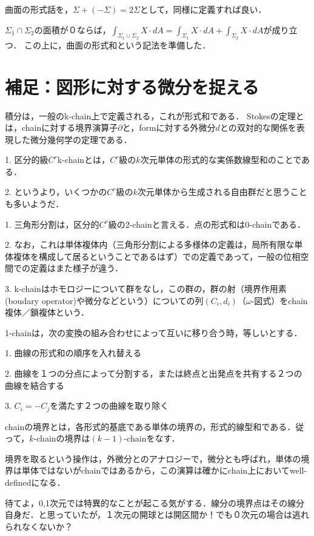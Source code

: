 \documentclass[uplatex, dvipdfmx]{jsreport}
\begin{document}
\begin{definition}[スカラー場の場合]
    曲面の形式話を，$\Sigma+(-\Sigma)=2\Sigma$として，同様に定義すれば良い．
\end{definition}

\begin{screen}
    $\Sigma_1\cap\Sigma_2$の面積が０ならば，$\int_{\Sigma_1\cup\Sigma_2}X\cdot dA=\int_{\Sigma_1}X\cdot dA+\int_{\Sigma_2}X\cdot dA$が成り立つ．
    この上に，曲面の形式和という記法を準備した．
\end{screen}

\section{補足：図形に対する微分を捉える}
積分は，一般のk-chain上で定義される，これが形式和である．
Stokesの定理とは，chainに対する境界演算子$\partial$と，formに対する外微分$d$との双対的な関係を表現した微分幾何学の定理である．

\begin{definition}[k-chain]
    1. 区分的級$C^r$k-chainとは，$C^r$級の$k$次元単体の形式的な実係数線型和のことである．

    2. というより，いくつかの$C^r$級の$k$次元単体から生成される自由群だと思うことも多いようだ．
\end{definition}
\begin{remark}
    1. 三角形分割は，区分的$C^r$級の2-chainと言える．点の形式和は0-chainである．

    2. なお，これは単体複体内（三角形分割による多様体の定義は，局所有限な単体複体を構成して居るということであるはず）での定義であって，一般の位相空間での定義はまた様子が違う．

    3. k-chainはホモロジーについて群をなし，この群の，群の射（境界作用素(boudary operator)や微分などという）についての列$(C_i,d_i)$（$\omega$-図式）をchain複体／鎖複体という．
\end{remark}

\begin{definition}1-chainは，次の変換の組み合わせによって互いに移り合う時，等しいとする．

    1. 曲線の形式和の順序を入れ替える

    2. 曲線を１つの分点によって分割する，または終点と出発点を共有する２つの曲線を結合する

    3. $C_i=-C_j$を満たす２つの曲線を取り除く
\end{definition}

\begin{definition}
    chainの境界とは，各形式的基底である単体の境界の，形式的線型和である．従って，$k$-chainの境界は$(k-1)$-chainをなす．

    境界を取るという操作は，外微分とのアナロジーで，微分とも呼ばれ，単体の境界は単体ではないがchainではあるから，この演算は確かにchain上においてwell-definedになる．
\end{definition}
\begin{remark}
    待てよ，0,1次元では特異的なことが起こる気がする．線分の境界点はその線分自身だ．と思っていたが，１次元の開球とは開区間か！でも０次元の場合は逃れられなくないか？
\end{remark}
\end{document}
